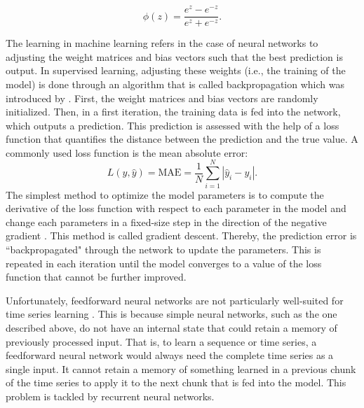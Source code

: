 \begin{equation} \label{Eq:activation}
    \phi(z)=\frac{e^z-e^{-z}}{e^z+e^{-z}}.
\end{equation}

The learning in machine learning refers in the case of neural networks to adjusting the weight matrices and bias vectors such that the best prediction is output. In supervised learning, adjusting these weights (i.e., the training of the model) is done through an algorithm that is called backpropagation which was introduced by \citet{Rumelhart:1986}. First, the weight matrices and bias vectors are randomly initialized. Then, in a first iteration, the training data is fed into the network, which outputs a prediction. This prediction is assessed with the help of a loss function that quantifies the distance between the prediction and the true value. 
\newpage
\noindent A commonly used loss function is the mean absolute error:
%
\begin{equation} \label{Eq:lossMAE}
    L\left(y, \widehat{y}\right)=\text{MAE}=\frac{1}{N}\sum_{i=1}^N\left|\widehat{y}_i-y_i\right|.
\end{equation}
%
The simplest method to optimize the model parameters is to compute the derivative of the loss function with respect to each parameter in the model and change each parameters in a fixed-size step in the direction of the negative gradient \citep{Graves:2013}. This method is called gradient descent. Thereby, the prediction error is ``backpropagated" through the network to update the parameters. This is repeated in each iteration until the model converges to a value of the loss function that cannot be further improved.




Unfortunately, feedforward neural networks are not particularly well-suited for time series learning \citep{Chollet:2018}. This is because simple neural networks, such as the one described above, do not have an internal state that could retain a memory of previously processed input. That is, to learn a sequence or time series, a feedforward neural network would always need the complete time series as a single input. It cannot retain a memory of something learned in a previous chunk of the time series to apply it to the next chunk that is fed into the model. This problem is tackled by recurrent neural networks.

